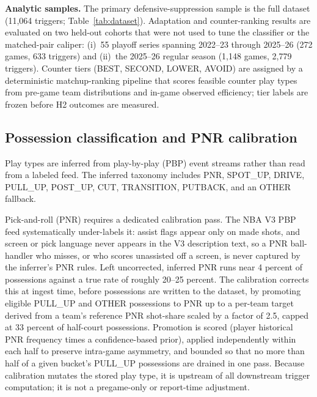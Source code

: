 \documentclass[11pt]{article}
\begin{document}
\textbf{Analytic samples.} The primary defensive-suppression sample is the full dataset (11,064 triggers; Table~\ref{tab:dataset}). Adaptation and counter-ranking results are evaluated on two held-out cohorts that were not used to tune the classifier or the matched-pair caliper: (i)~55 playoff series spanning 2022--23 through 2025--26 (272 games, 633 triggers) and (ii)~the 2025--26 regular season (1,148 games, 2,779 triggers). Counter tiers (BEST, SECOND, LOWER, AVOID) are assigned by a deterministic matchup-ranking pipeline that scores feasible counter play types from pre-game team distributions and in-game observed efficiency; tier labels are frozen before H2 outcomes are measured.

\subsection{Possession classification and PNR calibration}

Play types are inferred from play-by-play (PBP) event streams rather than read from a labeled feed. The inferred taxonomy includes PNR, SPOT\_UP, DRIVE, PULL\_UP, POST\_UP, CUT, TRANSITION, PUTBACK, and an OTHER fallback.

Pick-and-roll (PNR) requires a dedicated calibration pass. The NBA V3 PBP feed systematically under-labels it: assist flags appear only on made shots, and screen or pick language never appears in the V3 description text, so a PNR ball-handler who misses, or who scores unassisted off a screen, is never captured by the inferrer's PNR rules. Left uncorrected, inferred PNR runs near 4 percent of possessions against a true rate of roughly 20--25 percent. The calibration corrects this at ingest time, before possessions are written to the dataset, by promoting eligible PULL\_UP and OTHER possessions to PNR up to a per-team target derived from a team's reference PNR shot-share scaled by a factor of 2.5, capped at 33 percent of half-court possessions. Promotion is scored (player historical PNR frequency times a confidence-based prior), applied independently within each half to preserve intra-game asymmetry, and bounded so that no more than half of a given bucket's PULL\_UP possessions are drained in one pass. Because calibration mutates the stored play type, it is upstream of all downstream trigger computation; it is not a pregame-only or report-time adjustment.
\end{document}
